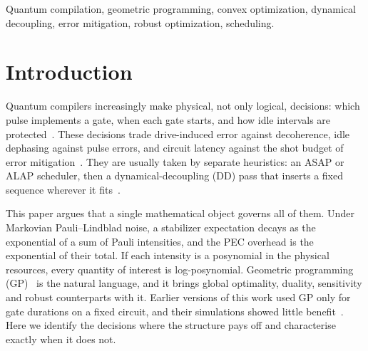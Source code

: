 \documentclass[10pt,journal]{IEEEtran}
\theoremstyle{remark}
\begin{document}
\begin{IEEEkeywords}
Quantum compilation, geometric programming, convex optimization, dynamical decoupling, error mitigation,
robust optimization, scheduling.
\end{IEEEkeywords}

\section{Introduction}
Quantum compilers increasingly make physical, not only logical, decisions: which pulse implements a gate,
when each gate starts, and how idle intervals are protected~\cite{murali2019,murali2020,earnest2021,lussi2025}.
These decisions trade drive-induced error against decoherence, idle dephasing against pulse errors, and
circuit latency against the shot budget of error mitigation~\cite{temme2017,vandenberg2023}. They are usually
taken by separate heuristics: an ASAP or ALAP scheduler, then a dynamical-decoupling (DD) pass that inserts a
fixed sequence wherever it fits~\cite{ezzell2023,das2021,ravi2022}.

This paper argues that a single mathematical object governs all of them. Under Markovian Pauli--Lindblad
noise, a stabilizer expectation decays as the exponential of a sum of Pauli intensities, and the PEC overhead
is the exponential of their total. If each intensity is a posynomial in the physical resources, every quantity
of interest is log-posynomial. Geometric programming (GP)~\cite{boyd2007} is the natural language, and it brings
global optimality, duality, sensitivity and robust counterparts with it. Earlier versions of this work used
GP only for gate durations on a fixed circuit, and their simulations showed little benefit~\cite{ramadan2026}.
Here we identify the decisions where the structure pays off and characterise exactly when it does not.
\end{document}
